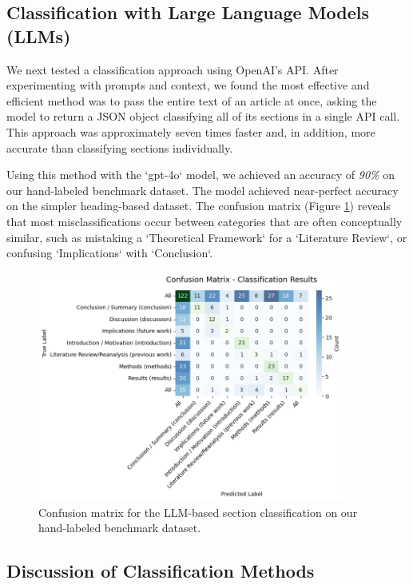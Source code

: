 


\subsection{Classification with Large Language Models (LLMs)}

We next tested a classification approach using OpenAI's API. After experimenting
with prompts and context, we found the most effective and efficient method was
to pass the entire text of an article at once, asking the model to return a JSON
object classifying all of its sections in a single API call. This approach was
approximately seven times faster and, in addition, more accurate than
classifying sections individually.

Using this method with the `gpt-4o` model, we achieved an accuracy of \emph{90\%}
on our hand-labeled benchmark dataset. The model achieved near-perfect accuracy
on the simpler heading-based dataset. The confusion matrix (Figure
\ref{fig:conf_matrix}) reveals that most misclassifications occur between
categories that are often conceptually similar, such as mistaking a `Theoretical
Framework` for a `Literature Review`, or confusing `Implications` with
`Conclusion`.

\begin{figure}
    \centering
    \includegraphics[width=0.9\textwidth]{media/confussion_matrix_sections.png}
    \caption{Confusion matrix for the LLM-based section classification on our hand-labeled benchmark dataset.}
    \label{fig:conf_matrix}
\end{figure}


\subsection{Discussion of Classification Methods}

